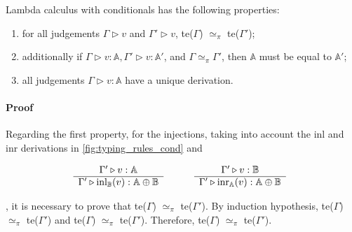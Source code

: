 \begin{theorem} \label {theorem:unique_der}
 Lambda calculus with conditionals has the following properties:
\begin{enumerate}
  \item for all judgements $\Gamma \triangleright v$ and $\Gamma' \triangleright v$, te($\Gamma$) $\simeq_{\pi}$  te($\Gamma'$); 
  \item additionally if $\Gamma \triangleright v: \mathbb{A}, \Gamma'\triangleright v: \mathbb{A}'$, and $\Gamma \simeq_{\pi} \Gamma' $, then $\mathbb{A}$ must be equal to $\mathbb{A}'$;
  \item all judgements $\Gamma \triangleright v:\mathbb{A}$ have a unique derivation.
\end{enumerate}
\end{theorem}

\paragraph{Proof} 

Regarding the first property, for the injections, taking into account the inl and inr derivations in \autoref{fig:typing_rules_cond} and

\begin{figure} [H]
  \begin{equation*}
  \begin{split}
  \begin{aligned}
  & \hspace{15pt}
  \begin{minipage}[t]{0.3\textwidth}
  $\begin{array}{c}
     \Gamma' \triangleright v: \mathbb{A} \\
    \hline
   \Gamma' \triangleright \text{inl}_{\mathbb{B}}(v):  \mathbb{A} \oplus \mathbb{B}
\end{array}
$
  \end{minipage} 
 \hspace{20pt}
\begin{minipage}[t]{0.3\textwidth}
$\begin{array}{c}
      \Gamma' \triangleright v:  \mathbb{B} \\
    \hline
   \Gamma' \triangleright \text{inr}_{\mathbb{A}}(v): \mathbb{A} \oplus \mathbb{B}
\end{array}
$ \end{minipage}
  \end{aligned}
  \end{split}
  \end{equation*}
  \end{figure}
, it is necessary to prove that te($\Gamma$) $\simeq_{\pi}$  te($\Gamma'$). By induction hypothesis, te($\Gamma$) $\simeq_{\pi}$  te($\Gamma'$) and te($\Gamma$) $\simeq_{\pi}$  te($\Gamma'$). Therefore, te($\Gamma$) $\simeq_{\pi}$  te($\Gamma'$).


